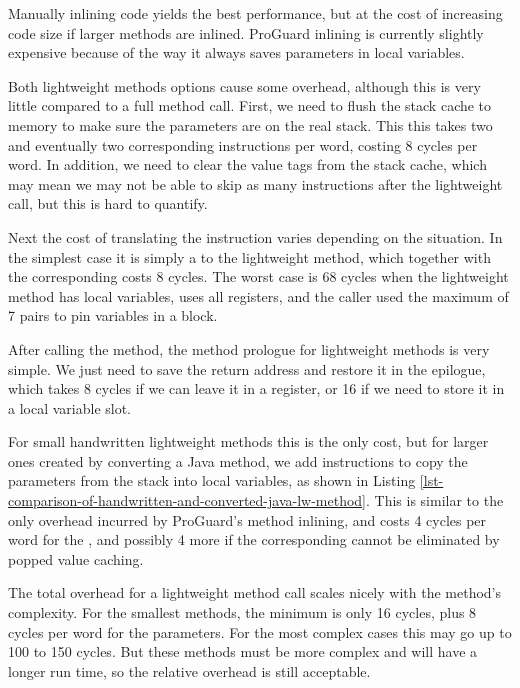 Manually inlining code yields the best performance, but at the cost of increasing code size if larger methods are inlined. ProGuard inlining is currently slightly expensive because of the way it always saves parameters in local variables.

Both lightweight methods options cause some overhead, although this is very little compared to a full method call. First, we need to flush the stack cache to memory to make sure the parameters are on the real stack. This this takes two  and eventually two corresponding  instructions per word, costing 8 cycles per word. In addition, we need to clear the value tags from the stack cache, which may mean we may not be able to skip as many  instructions after the lightweight call, but this is hard to quantify.

Next the cost of translating the  instruction varies depending on the situation. In the simplest case it is simply a  to the lightweight method, which together with the corresponding  costs 8 cycles. The worst case is 68 cycles when the lightweight method has local variables, uses all registers, and the caller used the maximum of 7 pairs to pin variables in a  block.

After calling the method, the method prologue for lightweight methods is very simple. We just need to save the return address and restore it in the epilogue, which takes 8 cycles if we can leave it in a register, or 16 if we need to store it in a local variable slot.

For small handwritten lightweight methods this is the only cost, but for larger ones created by converting a Java method, we add  instructions to copy the parameters from the stack into local variables, as shown in Listing \ref{lst-comparison-of-handwritten-and-converted-java-lw-method}. This is similar to the only overhead incurred by ProGuard's method inlining, and costs 4 cycles per word for the , and possibly 4 more if the corresponding  cannot be eliminated by popped value caching.

The total overhead for a lightweight method call scales nicely with the method's complexity. For the smallest methods, the minimum is only 16 cycles, plus 8 cycles per word for the parameters. For the most complex cases this may go up to 100 to 150 cycles. But these methods must be more complex and will have a longer run time, so the relative overhead is still acceptable.

